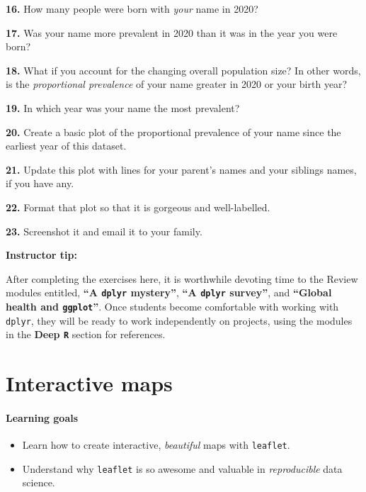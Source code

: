 \documentclass[
]{book}
\begin{document}
\textbf{16.} How many people were born with \emph{your} name in 2020?

\textbf{17.} Was your name more prevalent in 2020 than it was in the year you were born?

\textbf{18.} What if you account for the changing overall population size? In other words, is the \emph{proportional prevalence} of your name greater in 2020 or your birth year?

\textbf{19.} In which year was your name the most prevalent?

\textbf{20.} Create a basic plot of the proportional prevalence of your name since the earliest year of this dataset.

\textbf{21.} Update this plot with lines for your parent's names and your siblings names, if you have any.

\textbf{22.} Format that plot so that it is gorgeous and well-labelled.

\textbf{23.} Screenshot it and email it to your family.

\leavevmode{}%
\textbf{Instructor tip:}

After completing the exercises here, it is worthwhile devoting time to the Review modules entitled, \textbf{``A \texttt{dplyr} mystery''}, \textbf{``A \texttt{dplyr} survey''}, and \textbf{``Global health and \texttt{ggplot}''}. Once students become comfortable with working with \texttt{dplyr}, they will be ready to work independently on projects, using the modules in the \textbf{Deep \texttt{R}} section for references.

\hypertarget{interactive-maps}{%
\chapter{Interactive maps}\label{interactive-maps}}

\hypertarget{learning-goals-7}{%
\subsubsection*{Learning goals}\label{learning-goals-7}}

\begin{itemize}
\item
  Learn how to create interactive, \emph{beautiful} maps with \texttt{leaflet}.
\item
  Understand why \texttt{leaflet} is so awesome and valuable in \emph{reproducible} data science.
\end{itemize}
\end{document}
